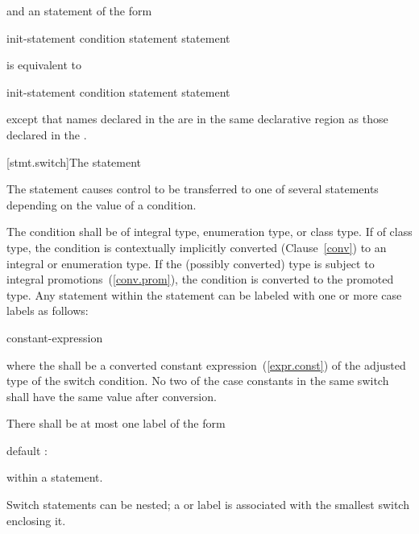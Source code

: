 and an  statement of the form

\begin{ncbnf}
 init-statement condition \terminal{)} statement  statement
\end{ncbnf}

is equivalent to

\begin{ncbnftab}
\terminal{\{}\br
\>init-statement\br
\> condition \terminal{)} statement  statement\br
\terminal{\}}
\end{ncbnftab}

except that names declared in the  are in
the same declarative region as those declared in the
.

[stmt.switch]{The  statement}%

\pnum
The  statement causes control to be transferred to one of
several statements depending on the value of a condition.

\pnum
The condition shall be of integral type, enumeration type, or class
type. If of class type, the
condition is contextually implicitly converted (Clause~\ref{conv}) to
an integral or enumeration type.
If the (possibly converted) type is subject to integral
promotions~(\ref{conv.prom}), the condition is converted
to the promoted type.
Any
statement within the  statement can be labeled with one or
more case labels as follows:

\begin{ncbnf}
%
 constant-expression \terminal{:}
\end{ncbnf}

where the  shall be
a converted constant expression~(\ref{expr.const}) of the
adjusted type of the switch condition. No two of the case constants in
the same switch shall have the same value after conversion.

\pnum
{}%
There shall be at most one label of the form

\begin{codeblock}
default :
\end{codeblock}

within a  statement.

\pnum
Switch statements can be nested; a  or  label
is associated with the smallest switch enclosing it.

